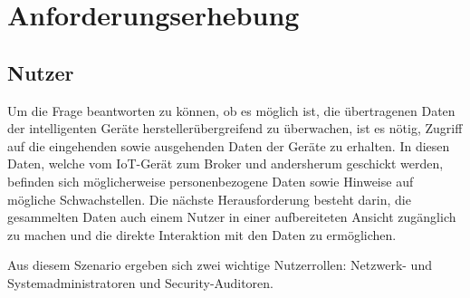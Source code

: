 \chapter{Anforderungserhebung} %

\section{Nutzer}
    Um die Frage beantworten zu können, ob es möglich ist, die übertragenen Daten der intelligenten Geräte herstellerübergreifend zu überwachen, ist es nötig, Zugriff auf die eingehenden sowie ausgehenden Daten der Geräte zu erhalten. In diesen Daten, welche vom \ac{IoT}-Gerät zum Broker und andersherum geschickt werden, befinden sich möglicherweise personenbezogene Daten sowie Hinweise auf mögliche Schwachstellen.
    Die nächste Herausforderung besteht darin, die gesammelten Daten auch einem Nutzer in einer aufbereiteten Ansicht zugänglich zu machen und die direkte Interaktion mit den Daten zu ermöglichen.

    Aus diesem Szenario ergeben sich zwei wichtige Nutzerrollen: Netzwerk- und Systemadministratoren und Security-Auditoren.
    
